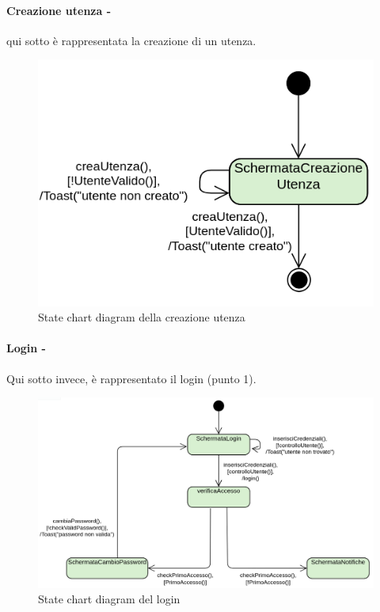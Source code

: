\paragraph{Creazione utenza -} qui sotto è rappresentata la creazione di un utenza.
\begin{figure}[H]
  \centering
  \includegraphics[scale=0.8]{img/stateChart/creazioneUtenza_state_chart.png}
  \caption{State chart diagram della creazione utenza}
\end{figure}  
\newpage
\paragraph{Login -} Qui sotto invece, è rappresentato il login (punto 1).
\begin{figure}[H]
  \centering
  \includegraphics[scale=0.5]{img/stateChart/login_state_chart.png}
  \caption{State chart diagram del login}
\end{figure}  